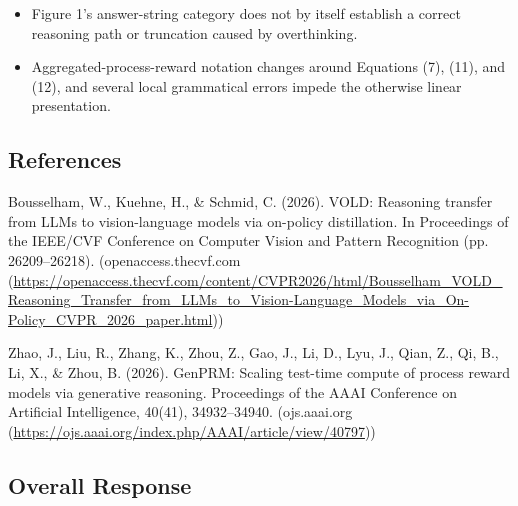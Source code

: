 \begin{itemize}
\item Figure 1's answer-string category does not by itself establish a correct reasoning path or truncation caused by overthinking.
\par{}
\begin{responsebox}[frametitle={Response to M5}]
\vspace*{2\baselineskip}
\end{responsebox}

\item Aggregated-process-reward notation changes around Equations (7), (11), and (12), and several local grammatical errors impede the otherwise linear presentation.
\par{}
\begin{responsebox}[frametitle={Response to M6}]
\vspace*{2\baselineskip}
\end{responsebox}

\end{itemize}

\subsection*{References}
Bousselham, W., Kuehne, H., \& Schmid, C. (2026). VOLD: Reasoning transfer from LLMs to vision-language models via on-policy distillation. In Proceedings of the IEEE/CVF Conference on Computer Vision and Pattern Recognition (pp. 26209--26218). (openaccess.thecvf.com (\url{https://openaccess.thecvf.com/content/CVPR2026/html/Bousselham_VOLD_Reasoning_Transfer_from_LLMs_to_Vision-Language_Models_via_On-Policy_CVPR_2026_paper.html}))

Zhao, J., Liu, R., Zhang, K., Zhou, Z., Gao, J., Li, D., Lyu, J., Qian, Z., Qi, B., Li, X., \& Zhou, B. (2026). GenPRM: Scaling test-time compute of process reward models via generative reasoning. Proceedings of the AAAI Conference on Artificial Intelligence, 40(41), 34932--34940. (ojs.aaai.org (\url{https://ojs.aaai.org/index.php/AAAI/article/view/40797}))

\subsection*{Overall Response}
\par{}
\begin{responsebox}[frametitle={Overall Response to AI Review}]
\vspace*{2\baselineskip}
\end{responsebox}
